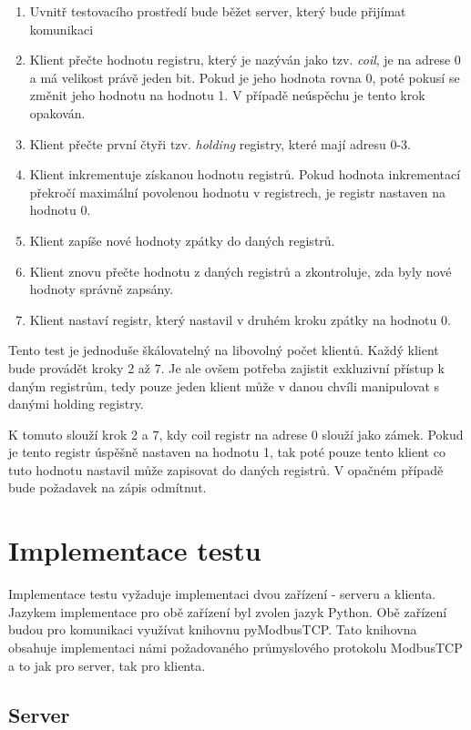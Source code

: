 \begin{enumerate}
    \item Uvnitř testovacího prostředí bude běžet server, který bude přijímat komunikaci
    \item Klient přečte hodnotu registru, který je nazýván jako tzv. \textit{coil}, je na adrese 0 a má velikost právě jeden bit. Pokud je jeho hodnota rovna 0, poté pokusí se změnit jeho hodnotu na hodnotu 1. V případě neúspěchu je tento krok opakován.
    \item Klient přečte první čtyři tzv. \textit{holding} registry, které mají adresu 0-3. 
    \item Klient inkrementuje získanou hodnotu registrů. Pokud hodnota inkrementací překročí maximální povolenou hodnotu v registrech, je registr nastaven na hodnotu 0.
    \item Klient zapíše nové hodnoty zpátky do daných registrů.
    \item Klient znovu přečte hodnotu z daných registrů a zkontroluje, zda byly nové hodnoty správně zapsány.
    \item Klient nastaví registr, který nastavil v druhém kroku zpátky na hodnotu 0.
\end{enumerate}

Tento test je jednoduše škálovatelný na libovolný počet klientů. Každý klient bude provádět kroky 2 až 7. Je ale ovšem potřeba zajistit exkluzivní přístup k daným registrům, tedy pouze jeden klient může v danou chvíli manipulovat s danými holding registry. 

K tomuto slouží krok 2 a 7, kdy coil registr na adrese 0 slouží jako zámek. Pokud je tento registr úspěšně nastaven na hodnotu 1, tak poté pouze tento klient co tuto hodnotu nastavil může zapisovat do daných registrů. V opačném případě bude požadavek na zápis odmítnut.

\section{Implementace testu}

Implementace testu vyžaduje implementaci dvou zařízení - serveru a klienta. Jazykem implementace pro obě zařízení byl zvolen jazyk Python. Obě zařízení budou pro komunikaci využívat knihovnu pyModbusTCP. Tato knihovna obsahuje implementaci námi požadovaného průmyslového protokolu ModbusTCP a to jak pro server, tak pro klienta.
 
\subsection{Server}

